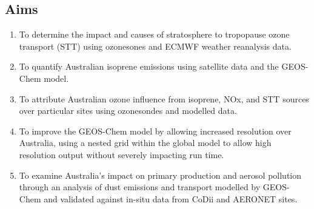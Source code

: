 
\subsection{Aims}
\begin{enumerate}
\item To determine the impact and causes of stratosphere to tropopause ozone transport (STT) using ozonesones and ECMWF weather reanalysis data.
\item To quantify Australian isoprene emissions using satellite data and the GEOS-Chem model. 
\item To attribute Australian ozone influence from isoprene, NOx, and STT sources over particular sites using ozonesondes and modelled data.
\item To improve the GEOS-Chem model by allowing increased resolution over Australia, using a nested grid within the global model to allow high resolution output without severely impacting run time.
\item To examine Australia's impact on primary production and aerosol pollution through an analysis of dust emissions and transport modelled by GEOS-Chem and validated against in-situ data from CoDii and AERONET sites.
\end{enumerate}